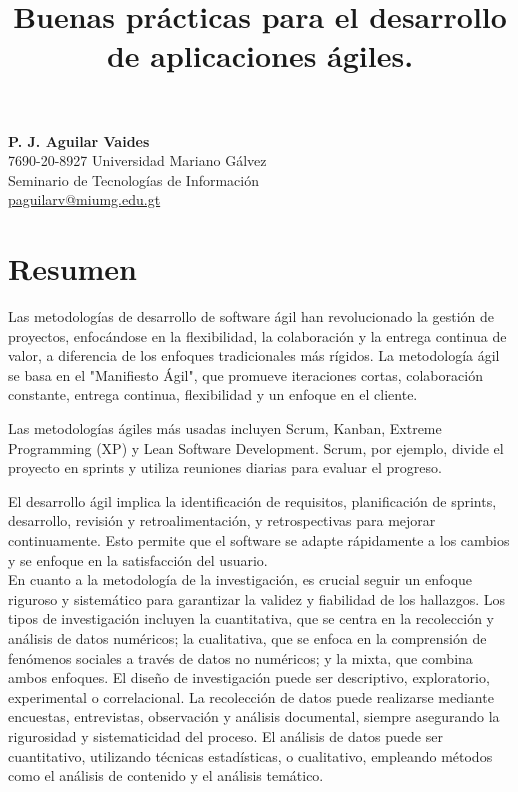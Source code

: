 \documentclass{article}
\title{\vspace{-2cm}\large\textbf{Buenas prácticas para el desarrollo de aplicaciones ágiles.}}
\author{}
\date{\vspace{-2.2cm}}
\begin{document}
\maketitle

\begin{center}
    \textbf{P. J. Aguilar Vaides} \\
    7690-20-8927 Universidad Mariano Gálvez \\
    Seminario de Tecnologías de Información \\
    \href{mailto:jperez@gmail.com}{paguilarv@miumg.edu.gt}
\end{center}

\section{Resumen}

Las metodologías de desarrollo de software ágil han revolucionado la gestión de proyectos, enfocándose en la flexibilidad, la colaboración y la entrega continua de valor, a diferencia de los enfoques tradicionales más rígidos. La metodología ágil se basa en el "Manifiesto Ágil", que promueve iteraciones cortas, colaboración constante, entrega continua, flexibilidad y un enfoque en el cliente.

Las metodologías ágiles más usadas incluyen Scrum, Kanban, Extreme Programming (XP) y Lean Software Development. Scrum, por ejemplo, divide el proyecto en sprints y utiliza reuniones diarias para evaluar el progreso.

El desarrollo ágil implica la identificación de requisitos, planificación de sprints, desarrollo, revisión y retroalimentación, y retrospectivas para mejorar continuamente. Esto permite que el software se adapte rápidamente a los cambios y se enfoque en la satisfacción del usuario.\\

En cuanto a la metodología de la investigación, es crucial seguir un enfoque riguroso y sistemático para garantizar la validez y fiabilidad de los hallazgos. Los tipos de investigación incluyen la cuantitativa, que se centra en la recolección y análisis de datos numéricos; la cualitativa, que se enfoca en la comprensión de fenómenos sociales a través de datos no numéricos; y la mixta, que combina ambos enfoques. El diseño de investigación puede ser descriptivo, exploratorio, experimental o correlacional. La recolección de datos puede realizarse mediante encuestas, entrevistas, observación y análisis documental, siempre asegurando la rigurosidad y sistematicidad del proceso. El análisis de datos puede ser cuantitativo, utilizando técnicas estadísticas, o cualitativo, empleando métodos como el análisis de contenido y el análisis temático.\\
\end{document}
